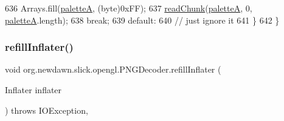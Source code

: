 \begin{DoxyCode}
636             Arrays.fill(\mbox{\hyperlink{classorg_1_1newdawn_1_1slick_1_1opengl_1_1_p_n_g_decoder_a273b1728dfd1158eb001f98fd4255a58}{paletteA}}, (byte)0xFF);
637             \mbox{\hyperlink{classorg_1_1newdawn_1_1slick_1_1opengl_1_1_p_n_g_decoder_ae2014f14734121c02f976b1fe4733c2d}{readChunk}}(\mbox{\hyperlink{classorg_1_1newdawn_1_1slick_1_1opengl_1_1_p_n_g_decoder_a273b1728dfd1158eb001f98fd4255a58}{paletteA}}, 0, \mbox{\hyperlink{classorg_1_1newdawn_1_1slick_1_1opengl_1_1_p_n_g_decoder_a273b1728dfd1158eb001f98fd4255a58}{paletteA}}.length);
638             \textcolor{keywordflow}{break};
639         \textcolor{keywordflow}{default}:
640             \textcolor{comment}{// just ignore it}
641         \}
642     \}
\end{DoxyCode}
\mbox{\label{classorg_1_1newdawn_1_1slick_1_1opengl_1_1_p_n_g_decoder_a041df9ceb129f2b773de08dff8899a28}} 
\subsubsection{\texorpdfstring{refill\+Inflater()}{refillInflater()}}
{\footnotesize\ttfamily void org.\+newdawn.\+slick.\+opengl.\+P\+N\+G\+Decoder.\+refill\+Inflater (\begin{DoxyParamCaption}\item[{Inflater}]{inflater }\end{DoxyParamCaption}) throws I\+O\+Exception\hspace{0.3cm}{\ttfamily [inline]}, {\ttfamily [private]}}


